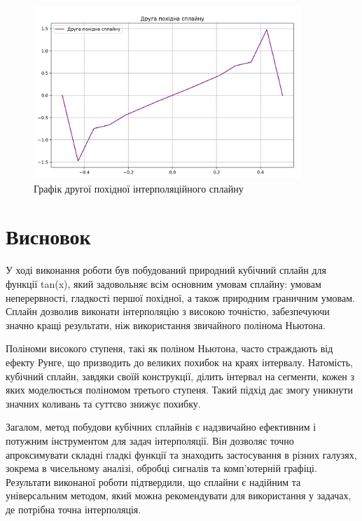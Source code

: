 \documentclass[a4paper, 12pt]{article}
\begin{document}
\begin{figure}[h!]
    \centering
    \includegraphics[width=0.9\textwidth]{second_der.png}
    \caption{Графік другої похідної інтерполяційного сплайну}
    \label{fig:second_der}
\end{figure}



\clearpage
\newpage
\section{Висновок}

У ході виконання роботи був побудований природний кубічний сплайн для функції tan(x), який задовольняє всім основним умовам сплайну: умовам неперервності, гладкості першої похідної, а також природним граничним умовам. Сплайн дозволив виконати інтерполяцію з високою точністю, забезпечуючи значно кращі результати, ніж використання звичайного полінома Ньютона. 

Поліноми високого ступеня, такі як поліном Ньютона, часто страждають від ефекту Рунге, що призводить до великих похибок на краях інтервалу. Натомість, кубічний сплайн, завдяки своїй конструкції, ділить інтервал на сегменти, кожен з яких моделюється поліномом третього ступеня. Такий підхід дає змогу уникнути значних коливань та суттєво знижує похибку.

Загалом, метод побудови кубічних сплайнів є надзвичайно ефективним і потужним інструментом для задач інтерполяції. Він дозволяє точно апроксимувати складні гладкі функції та знаходить застосування в різних галузях, зокрема в чисельному аналізі, обробці сигналів та комп’ютерній графіці. Результати виконаної роботи підтвердили, що сплайни є надійним та універсальним методом, який можна рекомендувати для використання у задачах, де потрібна точна інтерполяція.
\end{document}
